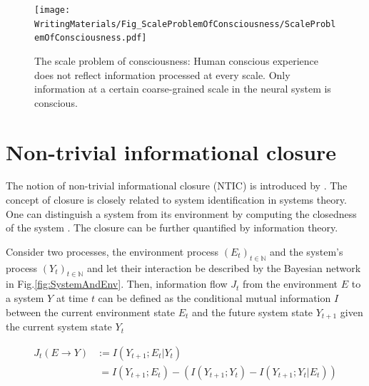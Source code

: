 \documentclass[utf8]{article}
\begin{document}
		\begin{figure}[H]
		    \centering
		    \label{fig:scaleproblem}
			\texttt{[image: WritingMaterials/Fig\_ScaleProblemOfConsciousness/ScaleProblemOfConsciousness.pdf]}
			\caption{The scale problem of consciousness: Human conscious experience does not reflect information processed at every scale. Only information at a certain coarse-grained scale in the neural system is conscious.}
	   	\end{figure}


	\section{Non-trivial informational closure} \label{sec:Non-trivial informational closure}
		The notion of non-trivial informational closure (NTIC) is introduced by \cite{BERTSCHINGER.2006}. The concept of closure is closely related to system identification in systems theory. One can distinguish a system from its environment by computing the closedness of the system \citep{maturana1991autopoiesis, rosen1991life, pattee2012evolving, luhmann1995probleme}. The closure can be further quantified by information theory.



			\noindent
			Consider two processes, the environment process $(E_t)_{t \in \mathbb{N}}$ and the system's process $(Y_t)_{t \in \mathbb{N}}$ and let their interaction be described by the Bayesian network in Fig.\ref{fig:SystemAndEnv}. Then, information flow $J_{t}$ from the environment $E$ to a system $Y$ at time $t$ can be defined as the conditional mutual information $I$ between the current environment state $E_{t}$  and the future system state $Y_{t+1}$ given the current system state $Y_{t}$

				\begin{equation}
    				\label{eq:InformationFlow}
    				\left.\begin{array}
    				{rl}{J_{t}(E \rightarrow Y )} & {:= I(Y_{t+1};E_{t}|Y_{t})} \\
    				{ } & { \ = I(Y_{t+1};E_{t}) - (I(Y_{t+1};Y_{t})-I(Y_{t+1};Y_{t}|E_{t}))}
    				\end{array}\right.
				\end{equation}
\end{document}
